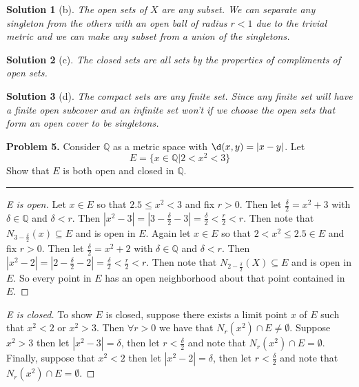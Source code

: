 \documentclass[leqno]{article}
\theoremstyle{nonumberplain}
\newtheorem{proof}{Proof}
\newtheorem{solution}{Solution}
\begin{document}
\begin{solution}[b]
\item The open sets of $X$ are any subset.  We can separate any singleton from the others with an open ball of radius $r<1$ due to the trivial metric and we can make any subset from a union of the singletons. 
\end{solution}
\begin{solution}[c]
The closed sets are all sets by the properties of compliments of open sets.
\end{solution}
\begin{solution}[d]
The compact sets are any finite set.  Since any finite set will have a finite open subcover and an infinite set won't if we choose the open sets that form an open cover to be singletons.
\end{solution}

\pagebreak




\noindent\textbf{Problem 5.} Consider $\mathbb{Q}$ as a metric space with $\d(x,y)=|x-y|$. Let
\[
E=\{x\in \mathbb{Q} \vert 2 < x^2 <3\}
\]
Show that $E$ is both open and closed in $\mathbb{Q}$.

\noindent\rule[0.5ex]{\linewidth}{1pt}

\begin{proof}[E is open]
Let $x\in E$ so that $2.5\leq x^2 <3$ and fix $r>0$.  Then let $\frac{\delta}{2}=x^2+3$ with $\delta\in \mathbb{Q}$ and $\delta<r$. Then $|x^2-3|=|3-\frac{\delta}{2}-3|=\frac{\delta}{2}<\frac{r}{2}<r$. Then note that $N_{3-\frac{\delta}{2}}(x)\subseteq E$ and is open in $E$.  Again let $x\in E$ so that $2<x^2\leq 2.5\in E$ and fix $r>0$.  Then let $\frac{\delta}{2}=x^2+2$ with $\delta\in \mathbb{Q}$ and $\delta<r$. Then $|x^2-2|=|2-\frac{\delta}{2}-2|=\frac{\delta}{2}<\frac{r}{2}<r$. Then note that $N_{2-\frac{\delta}{2}}(X)\subseteq E$ and is open in $E$. So every point in $E$ has an open neighborhood about that point contained in $E$.
\end{proof}

\begin{proof}[E is closed]
To show $E$ is closed, suppose there exists a limit point $x$ of $E$ such that $x^2<2$ or $x^2>3$.  Then $\forall r>0$ we have that $N_r(x^2)\cap E\neq\emptyset$.  Suppose $x^2>3$ then let $|x^2-3|=\delta$, then let $r<\frac{\delta}{2}$ and note that $N_r(x^2)\cap E = \emptyset$.  Finally, suppose that $x^2<2$ then let $|x^2-2|=\delta$, then let $r<\frac{\delta}{2}$ and note that $N_r(x^2)\cap E = \emptyset$.
\end{proof}

\pagebreak
\end{document}
